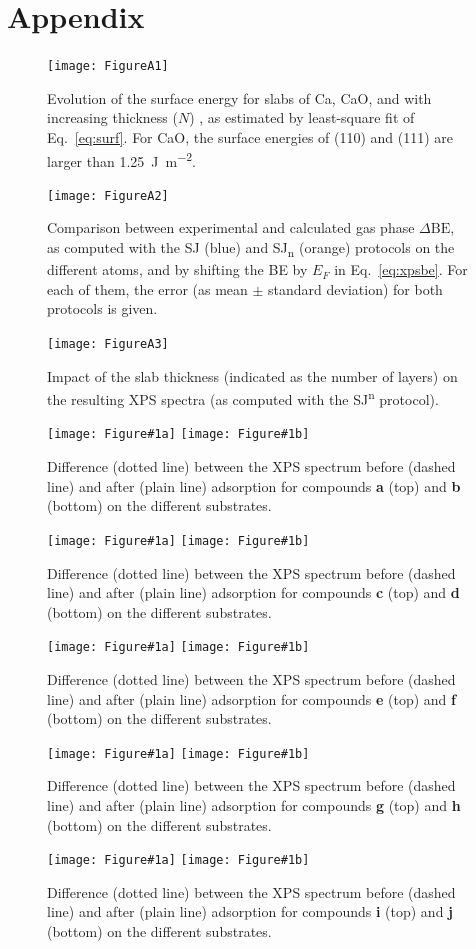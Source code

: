 \documentclass[12pt,a4paper]{article}
\def\dbe{\ensuremath{\Delta\text{BE}}}
\begin{document}

\clearpage
\appendix
{}
\section{Appendix}
\begin{figure}[!h]
	\texttt{[image: FigureA1]}
	\caption{Evolution of the surface energy for slabs of Ca, CaO, and  with increasing thickness ($N$) , as estimated by least-square fit of Eq.~\eqref{eq:surf}. For CaO, the surface energies of (110) and (111) are larger than \SI{1.25}{\joule\per\meter\squared}.}
	\label{fig:surf}
\end{figure}

\begin{figure}[!h]
	\centering
	\texttt{[image: FigureA2]}
	\caption{Comparison between experimental and calculated gas phase \dbe{}, as computed with the SJ (blue) and SJ\textsubscript{n} (orange) protocols on the different atoms, and by shifting the BE by $E_F$ in Eq.~\eqref{eq:xpsbe}. For each of them, the error (as mean $\pm$ standard deviation) for both protocols is given.}
	\label{fig:xps_C185_fermi}
\end{figure}


\begin{figure}[!h]
	\centering
	\texttt{[image: FigureA3]}
	\caption{Impact of the slab thickness (indicated as the number of layers) on the resulting XPS spectra (as computed with the SJ\textsuperscript{n} protocol).}
	\label{fig:slabsthicknessSJn}
\end{figure}


\newcommand{\XPSsa}[3]{
\begin{figure}[!h]
	\centering
	\texttt{[image: Figure\#1a]}
	\texttt{[image: Figure\#1b]}
	\caption{Difference (dotted line) between the XPS spectrum before (dashed line) and after (plain line) adsorption for compounds \textbf{#2} (top) and \textbf{#3} (bottom) on the different substrates.}
	\label{fig:spectraXPSads#2#3}
\end{figure}
}

\XPSsa{A4}{a}{b}
\XPSsa{A5}{c}{d}
\XPSsa{A6}{e}{f}
\XPSsa{A7}{g}{h}
\XPSsa{A8}{i}{j}


	
\end{document}
